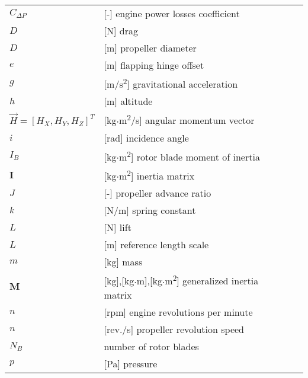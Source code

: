 \begin{longtable}[l]{ l l p{} }
  $C_{\Delta P}$                                         & [-] engine power losses coefficient \\
  $D$                                                    & [N] drag \\
  $D$                                                    & [m] propeller diameter \\
  $e$                                                    & [m] flapping hinge offset \\
  $g$                                                    & [m/s\textsuperscript{2}] gravitational acceleration \\
  $h$                                                    & [m] altitude \\
  $\vec H=\left[ H_X, H_Y, H_Z \right]^T$                & [kg$\cdot$m\textsuperscript{2}/s] angular momentum vector \\
  $i$                                                    & [rad] incidence angle \\
  $I_B$                                                  & [kg$\cdot$m\textsuperscript{2}] rotor blade moment of inertia \\
  $\boldsymbol I$                                        & [kg$\cdot$m\textsuperscript{2}] inertia matrix \\
  $J$                                                    & [-] propeller advance ratio \\
  $k$                                                    & [N/m] spring constant \\
  $L$                                                    & [N] lift \\
  $L$                                                    & [m] reference length scale \\
  $m$                                                    & [kg] mass \\
  $\boldsymbol M$                                        & [kg],[kg$\cdot$m],[kg$\cdot$m\textsuperscript{2}] generalized inertia matrix \\
  $n$                                                    & [rpm] engine revolutions per minute \\
  $n$                                                    & [rev./s] propeller revolution speed \\
  $N_B$                                                  & number of rotor blades \\
  $p$                                                    & [Pa] pressure \\

\end{longtable}
